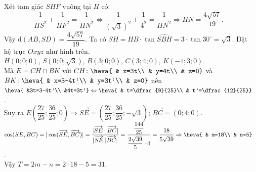 \begin{ex}
{\begin{itemchoice}
Xét tam giác $SHF$ vuông tại $H$ có: \[\dfrac{1}{HS^2}+\dfrac{1}{HF^2}=\dfrac{1}{HN^2}\Leftrightarrow\dfrac{1}{(\sqrt{3})^2}+\dfrac{1}{4^2}=\dfrac{1}{HN^2}\Rightarrow HN=\dfrac{4\sqrt{57}}{19}.\]
Vậy $\mathrm{d}(AB,SD)=\dfrac{4\sqrt{57}}{19}$.
\itemch Ta có $SH=HB\cdot\tan\widehat{SBH}=3\cdot\tan 30^\circ=\sqrt{3}$.
\itemch Đặt hệ trục $Oxyz$ như hình trên.\\
$H(0;0;0)$, $S(0;0;\sqrt{3})$, $B(3;0;0)$, $C(3;4;0)$, $K(-1;3;0)$.\\
Mà $E=CH\cap  BK$ với $CH\colon \heva{ & x=3t\\ & y=4t\\ & z=0}$ và $BK\colon \heva{ & x=3-4t'\\ & y=3t'\\ & z=0}$
nên $\heva{ &3t=3-4t'\\ &4t=3t'}\Leftrightarrow\heva{ & t=\dfrac{9}{25}\\ & t'=\dfrac{12}{25}}$.\\
Suy ra $E\left(\dfrac{27}{25};\dfrac{36}{25};0\right)\Rightarrow\overrightarrow{SE}=\left(\dfrac{27}{25};\dfrac{36}{25};-\sqrt{3}\right)$; $\overrightarrow{BC}=(0;4;0)$.\\
$\cos(SE,BC)=|\cos(\overrightarrow{SE},\overrightarrow{BC})|=\dfrac{|\overrightarrow{SE}\cdot \overrightarrow{BC}|}{|\overrightarrow{SE}||\overrightarrow{BC}|}=\dfrac{\dfrac{144}{25}}{\dfrac{2\sqrt{39}}{5}\cdot 4}=\dfrac{18}{5\sqrt{39}}\Rightarrow\heva{ & m=18\\ & n=5}$.\\
Vậy $T=2m-n=2\cdot 18-5=31$.
\end{itemchoice}
}
\end{ex}
